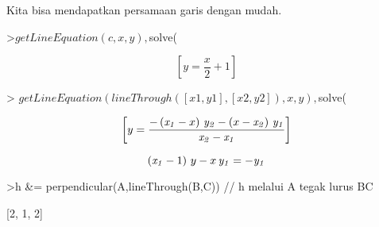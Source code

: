 \documentclass[12pt,arial,letterpaper]{book}
\begin{document}
\begin{eulercomment}
\begin{eulercomment}
\begin{eulercomment}
\begin{eulercomment}
\begin{eulercomment}
\begin{eulercomment}
\begin{eulercomment}
\begin{eulercomment}
\begin{eulercomment}
\begin{eulercomment}
\begin{eulercomment}
\begin{eulercomment}
\begin{eulercomment}
\begin{eulercomment}
\begin{eulercomment}
\begin{eulercomment}
\begin{eulercomment}
\begin{eulercomment}
\begin{eulercomment}
\begin{eulercomment}
\begin{eulercomment}
\begin{eulercomment}
\begin{eulercomment}
\begin{eulercomment}
\begin{eulercomment}
\begin{eulercomment}
\begin{euleroutput}
\end{euleroutput}
\begin{eulercomment}
Kita bisa mendapatkan persamaan garis dengan mudah.
\end{eulercomment}
\begin{eulerprompt}
>$getLineEquation(c,x,y), $solve(%
\end{eulerprompt}
\begin{eulerformula}
\[
\left[ y=\frac{x}{2}+1 \right] 
\]
\end{eulerformula}
\begin{eulerprompt}
> $getLineEquation(lineThrough([x1,y1],[x2,y2]),x,y), $solve(%
\end{eulerprompt}
\begin{eulerformula}
\[
\left[ y=\frac{-\left({\it x_1}-x\right)\,{\it y_2}-\left(x-  {\it x_2}\right)\,{\it y_1}}{{\it x_2}-{\it x_1}} \right] 
\]
\end{eulerformula}
\begin{eulerformula}
\[
\left({\it x_1}-1\right)\,y-x\,{\it y_1}=-{\it y_1}
\]
\end{eulerformula}
\begin{eulerprompt}
>h &= perpendicular(A,lineThrough(B,C)) // h melalui A tegak lurus BC
\end{eulerprompt}
\begin{euleroutput}
  
                                [2, 1, 2]
  

\end{euleroutput}
\end{eulercomment}
\end{eulercomment}
\end{eulercomment}
\end{eulercomment}
\end{eulercomment}
\end{eulercomment}
\end{eulercomment}
\end{eulercomment}
\end{eulercomment}
\end{eulercomment}
\end{eulercomment}
\end{eulercomment}
\end{eulercomment}
\end{eulercomment}
\end{eulercomment}
\end{eulercomment}
\end{eulercomment}
\end{eulercomment}
\end{eulercomment}
\end{eulercomment}
\end{eulercomment}
\end{eulercomment}
\end{eulercomment}
\end{eulercomment}
\end{eulercomment}
\end{eulercomment}
\end{document}
